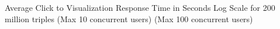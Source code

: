 \centering
Average Click to Visualization Response Time in Seconds Log Scale for 200 million triples\newline
(Max 10 concurrent users) (Max 100 concurrent users)